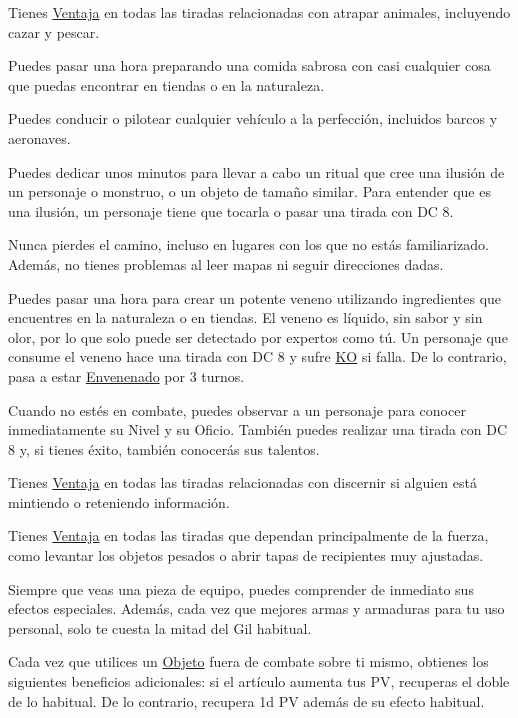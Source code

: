 \begin{description}[leftmargin=*]
{
 Tienes \hyperlink{check}{Ventaja} en todas las tiradas relacionadas con atrapar animales, incluyendo cazar y pescar.
}

{
	Puedes pasar una hora preparando una comida sabrosa con casi cualquier cosa que puedas encontrar en tiendas o en la naturaleza.
}

{
	Puedes conducir o pilotear cualquier vehículo a la perfección, incluidos barcos y aeronaves. 
}

{
	Puedes dedicar unos minutos para llevar a cabo un ritual que cree una ilusión de un personaje o monstruo, o un objeto de tamaño similar. Para entender que es una ilusión, un personaje tiene que tocarla o pasar una tirada con DC 8.
}

{
	Nunca pierdes el camino, incluso en lugares con los que no estás familiarizado. Además, no tienes problemas al leer mapas ni seguir direcciones dadas. 
}

{
	Puedes pasar una hora para crear un potente veneno utilizando ingredientes que encuentres en la naturaleza o en tiendas. El veneno es líquido, sin sabor y sin olor, por lo que solo puede ser detectado por expertos como tú. Un personaje que consume el veneno hace una tirada con DC 8 y sufre \hyperlink{status}{KO} si falla. De lo contrario, pasa a estar \hyperlink{status}{Envenenado} por 3 turnos. 
}

{
	Cuando no estés en combate, puedes observar a un personaje para conocer inmediatamente su Nivel y su Oficio. También puedes realizar una tirada con DC 8 y, si tienes éxito, también conocerás sus talentos.
}

\pagebreak

{
	Tienes \hyperlink{check}{Ventaja} en todas las tiradas relacionadas con discernir si alguien está mintiendo o reteniendo información.
}

{
	Tienes \hyperlink{check}{Ventaja} en todas las tiradas que dependan principalmente de la fuerza, como levantar los objetos pesados o abrir tapas de recipientes muy ajustadas.
}

{
	Siempre que veas una pieza de equipo, puedes comprender de inmediato sus efectos especiales. Además, cada vez que mejores armas y armaduras para tu uso personal, solo te cuesta la mitad del Gil habitual.
}

{
	Cada vez que utilices un \hyperlink{item}{Objeto} fuera de combate sobre ti mismo, obtienes los siguientes beneficios adicionales: si el artículo aumenta tus PV, recuperas el doble de lo habitual. De lo contrario, recupera 1d PV además de su efecto habitual. 
}


\end{description}
